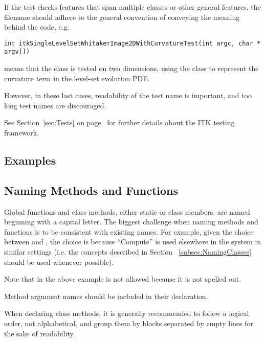 If the test checks features that span multiple classes or other general
features, the filename should adhere to the general convention of conveying the
meaning behind the code, e.g.
\small
\begin{verbatim}
int itkSingleLevelSetWhitakerImage2DWithCurvatureTest(int argc, char * argv[])
\end{verbatim}
\normalsize

means that the  class is tested on two
dimensions, using the  class to
represent the curvature term in the level-set evolution PDE.

However, in these last cases, readability of the test name is important, and too
long test names are discouraged.

See Section~\ref{sec:Tests} on page~\pageref{sec:Tests} for further details
about the ITK testing framework.


\subsection{Examples}
\label{subsec:Examples}


\subsection{Naming Methods and Functions}
\label{subsec:NamingMethodsAndFunctions}

Global functions and class methods, either static or class members, are named
beginning with a capital letter. The biggest challenge when naming methods and
functions is to be consistent with existing names. For example, given the choice
between  and , the
choice is   because ``Compute'' is used elsewhere in
the system in similar settings (i.e. the concepts described in Section
~\ref{subsec:NamingClasses} should be used whenever possible).

Note that in the above example  is not allowed because
it is not spelled out.

Method argument names should be included in their declaration.

When declaring class methods, it is generally recommended to follow a logical
order, not alphabetical, and group them by blocks separated by empty
lines for the sake of readability.

